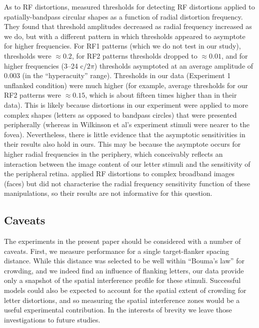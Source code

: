 \documentclass[doc, 11pt,a4paper,natbib]{apa6}\usepackage[]{graphicx}\usepackage[]{color}
\begin{document}
As to RF distortions,
\citet{wilkinson_detection_1998} measured thresholds for detecting RF distortions applied to spatially-bandpass circular shapes as a function of radial distortion frequency.
They found that threshold amplitudes decreased as radial frequency increased as we do, but with a different pattern in which thresholds appeared to asymptote for higher frequencies.
For RF1 patterns (which we do not test in our study), thresholds were $\approx 0.2$, for RF2 patterns thresholds dropped to $\approx 0.01$, and for higher frequencies (3--24 $\mathrm{c}/2\pi$) thresholds asymptoted at an average amplitude of $0.003$ (in the ``hyperacuity'' range).
Thresholds in our data (Experiment 1 unflanked condition) were much higher (for example, average thresholds for our RF2 patterns were $\approx 0.15$, which is about fifteen times higher than in their data).
This is likely because distortions in our experiment were applied to more complex shapes (letters as opposed to bandpass circles) that were presented peripherally (whereas in Wilkinson et al's experiment stimuli were nearer to the fovea).
Nevertheless, there is little evidence that the asymptotic sensitivities in their results also hold in ours.
This may be because the asymptote occurs for higher radial frequencies in the periphery, which conceivably reflects an interaction between the image content of our letter stimuli and the sensitivity of the peripheral retina.
\citet[][see also \citet{dickinson_rapidly_2012}]{dickinson_global_2010} applied RF distortions to complex broadband images (faces) but did not characterise the radial frequency sensitivity function of these manipulations, so their results are not informative for this question.

\subsection{Caveats}

The experiments in the present paper should be considered with a number of caveats.
First, we measure performance for a single target-flanker spacing distance.
While this distance was selected to be well within ``Bouma's law'' for crowding, and we indeed find an influence of flanking letters, our data provide only a snapshot of the spatial interference profile for these stimuli.
Successful models could also be expected to account for the spatial extent of crowding for letter distortions, and so measuring the spatial interference zones would be a useful experimental contribution.
In the interests of brevity we leave those investigations to future studies.
\end{document}
